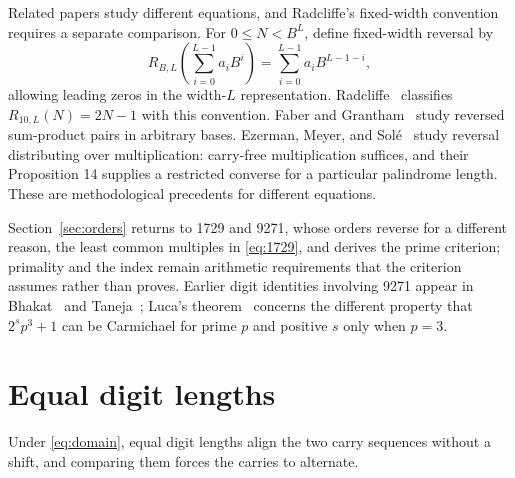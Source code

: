 \documentclass[11pt]{amsart}
\theoremstyle{remark}\newtheorem{remark}[theorem]{Remark}
\begin{document}
Related papers study different equations, and Radcliffe's fixed-width convention requires a separate comparison. For $0\le N<B^L$, define fixed-width reversal by
\[
 R_{B,L}\!\left(\sum_{i=0}^{L-1}a_iB^i\right)
 =\sum_{i=0}^{L-1}a_iB^{L-1-i},
\]
allowing leading zeros in the width-$L$ representation. Radcliffe~\cite[Theorems 4--5]{Radcliffe2015} classifies $R_{10,L}(N)=2N-1$ with this convention. Faber and Grantham~\cite[pp.~28--29]{FaberGrantham2023} study reversed sum-product pairs in arbitrary bases. Ezerman, Meyer, and Sol\'e~\cite[equation (1), p.~2; Propositions 1--2, p.~4]{Ezerman2015} study reversal distributing over multiplication: carry-free multiplication suffices, and their Proposition 14 supplies a restricted converse for a particular palindrome length. These are methodological precedents for different equations.

Section~\ref{sec:orders} returns to 1729 and 9271, whose orders reverse for a different reason, the least common multiples in \eqref{eq:1729}, and derives the prime criterion; primality and the index remain arithmetic requirements that the criterion assumes rather than proves. Earlier digit identities involving 9271 appear in Bhakat~\cite[Example 2, p.~83]{Bhakat2017} and Taneja~\cite[Sections 19 and 29]{Taneja2017}; Luca's theorem~\cite[Theorem 1]{Luca2026} concerns the different property that $2^s p^3+1$ can be Carmichael for prime $p$ and positive $s$ only when $p=3$.

\section{Equal digit lengths}\label{sec:digits}
Under \eqref{eq:domain}, equal digit lengths align the two carry sequences without a shift, and comparing them forces the carries to alternate.
\end{document}
